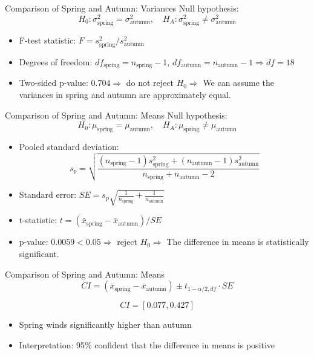 \documentclass[aspectratio=169]{beamer}
\begin{document}
\begin{frame}{Comparison of Spring and Autumn: Variances}
Null hypothesis:
\[
H_0: \sigma_{\text{spring}}^2 = \sigma_{\text{autumn}}^2, \quad
H_A: \sigma_{\text{spring}}^2 \neq \sigma_{\text{autumn}}^2
\]

\begin{itemize}
  \item F-test statistic: $F = s_{\text{spring}}^2 / s_{\text{autumn}}^2$
  \item Degrees of freedom: $df_{\text{spring}} = n_{\text{spring}}-1$, $df_{\text{autumn}} = n_{\text{autumn}}-1 \Rightarrow df=18$
  \item Two-sided p-value: $0.704 \Rightarrow$ do not reject $H_0 \Rightarrow$ We can assume
the variances in spring and autumn are approximately equal.
\end{itemize}

\end{frame}

\begin{frame}{Comparison of Spring and Autumn: Means}
Null hypothesis:
\[
H_0: \mu_{\text{spring}} = \mu_{\text{autumn}}, \quad
H_A: \mu_{\text{spring}} \neq \mu_{\text{autumn}}
\]

\begin{itemize}
  \item Pooled standard deviation:
  \[
  s_p = \sqrt{\frac{(n_{\text{spring}}-1)s_{\text{spring}}^2 + (n_{\text{autumn}}-1)s_{\text{autumn}}^2}{n_{\text{spring}}+n_{\text{autumn}}-2}}
  \]
  \item Standard error: $SE = s_p \sqrt{\frac{1}{n_{\text{spring}}} + \frac{1}{n_{\text{autumn}}}}$
  \item t-statistic: $t = (\bar x_{\text{spring}} - \bar x_{\text{autumn}})/SE$
  \item p-value: $0.0059 < 0.05 \Rightarrow$ reject $H_0 \Rightarrow $ The difference in means is statistically significant.
\end{itemize}

\end{frame}

\begin{frame}{Comparison of Spring and Autumn: Means}
\[
CI = (\bar x_{\text{spring}} - \bar x_{\text{autumn}}) \pm t_{1-\alpha/2, df} \cdot SE
\]

\[
CI = [0.077, 0.427]
\]

\begin{itemize}
  \item Spring winds significantly higher than autumn
  \item Interpretation: 95\% confident that the difference in means is positive
\end{itemize}
\end{frame}
\end{document}
